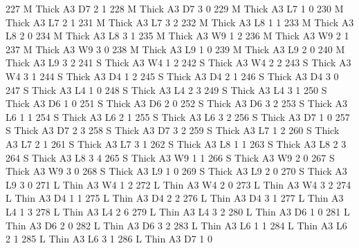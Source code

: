 \documentclass{article}
\begin{document}
\begin{Schunk}
\begin{Soutput}
227       M  Thick   A3      D7     2     1
228       M  Thick   A3      D7     3     0
229       M  Thick   A3      L7     1     0
230       M  Thick   A3      L7     2     1
231       M  Thick   A3      L7     3     2
232       M  Thick   A3      L8     1     1
233       M  Thick   A3      L8     2     0
234       M  Thick   A3      L8     3     1
235       M  Thick   A3      W9     1     2
236       M  Thick   A3      W9     2     1
237       M  Thick   A3      W9     3     0
238       M  Thick   A3      L9     1     0
239       M  Thick   A3      L9     2     0
240       M  Thick   A3      L9     3     2
241       S  Thick   A3      W4     1     2
242       S  Thick   A3      W4     2     2
243       S  Thick   A3      W4     3     1
244       S  Thick   A3      D4     1     2
245       S  Thick   A3      D4     2     1
246       S  Thick   A3      D4     3     0
247       S  Thick   A3      L4     1     0
248       S  Thick   A3      L4     2     3
249       S  Thick   A3      L4     3     1
250       S  Thick   A3      D6     1     0
251       S  Thick   A3      D6     2     0
252       S  Thick   A3      D6     3     2
253       S  Thick   A3      L6     1     1
254       S  Thick   A3      L6     2     1
255       S  Thick   A3      L6     3     2
256       S  Thick   A3      D7     1     0
257       S  Thick   A3      D7     2     3
258       S  Thick   A3      D7     3     2
259       S  Thick   A3      L7     1     2
260       S  Thick   A3      L7     2     1
261       S  Thick   A3      L7     3     1
262       S  Thick   A3      L8     1     1
263       S  Thick   A3      L8     2     3
264       S  Thick   A3      L8     3     4
265       S  Thick   A3      W9     1     1
266       S  Thick   A3      W9     2     0
267       S  Thick   A3      W9     3     0
268       S  Thick   A3      L9     1     0
269       S  Thick   A3      L9     2     0
270       S  Thick   A3      L9     3     0
271       L   Thin   A3      W4     1     2
272       L   Thin   A3      W4     2     0
273       L   Thin   A3      W4     3     2
274       L   Thin   A3      D4     1     1
275       L   Thin   A3      D4     2     2
276       L   Thin   A3      D4     3     1
277       L   Thin   A3      L4     1     3
278       L   Thin   A3      L4     2     6
279       L   Thin   A3      L4     3     2
280       L   Thin   A3      D6     1     0
281       L   Thin   A3      D6     2     0
282       L   Thin   A3      D6     3     2
283       L   Thin   A3      L6     1     1
284       L   Thin   A3      L6     2     1
285       L   Thin   A3      L6     3     1
286       L   Thin   A3      D7     1     0

\end{Soutput}
\end{Schunk}
\end{document}
